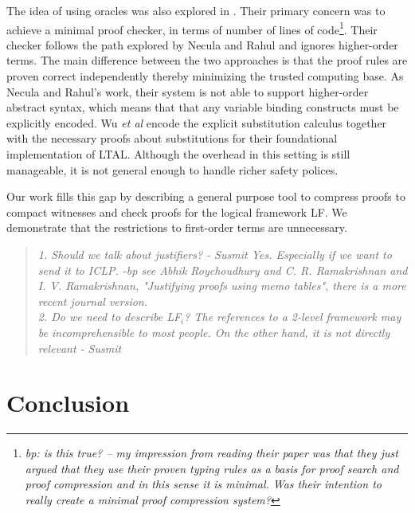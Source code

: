 \documentclass{acmconf}
\newcommand{\ednote}[1]{\footnote{\it #1}}
\newenvironment{note}{\begin{quote}\message{note!}\it}{\end{quote}}
\begin{document}
The idea of using oracles was also explored in
\cite{Appel:PPDP03}. Their primary concern was to 
achieve a minimal proof checker, in terms of number of lines of
code\ednote{bp: is this true? -- my impression from reading their
  paper was that they just argued that they use their proven typing
  rules as a basis for proof search and proof compression and in this
  sense it is minimal. Was their intention to really create a minimal
  proof compression system?}. Their checker follows the path explored
by Necula and Rahul and ignores higher-order terms. The main difference between the two
approaches is that the proof rules are proven correct
independently thereby minimizing the trusted computing base.
As Necula and Rahul's work, their system is not able to support
higher-order abstract syntax, which means that  
that any variable binding constructs must be
explicitly encoded. Wu {\em et al}\cite{Appel:PPDP03}
encode the explicit substitution calculus \cite{Abadi:POPL90} together
with the necessary proofs about substitutions for their foundational
implementation of LTAL. Although the overhead in this setting is still
manageable, it is not general enough to handle richer safety polices.

 Our work fills this gap by describing a general purpose tool to
 compress proofs to compact witnesses and check proofs for the logical
framework LF. We demonstrate that the restrictions to first-order terms
are unnecessary. 

\begin{note}
 1. Should we talk about justifiers? - Susmit Yes. Especially if we
 want to send it to ICLP. -bp see Abhik Roychoudhury and C. R. Ramakrishnan and I. V. Ramakrishnan,
    "Justifying proofs using memo tables", there is a more recent
    journal version.\\
 2. Do we need to describe LF$_i$? The references to a 2-level framework 
    may be incomprehensible to most people. On the other hand, it is not
    directly relevant - Susmit
\end{note}

\section{Conclusion}




\end{document}
